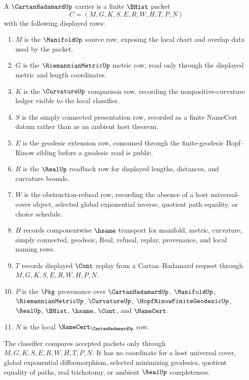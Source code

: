 \begin{definition}
\label{def:cartan-hadamard-carrier}
A $\CartanHadamardUp$ carrier is a finite $\BHist$ packet
$$
C=(M,G,K,S,E,R,W,H,T,P,N)
$$
with the following displayed rows:
\begin{enumerate}
\item $M$ is the $\ManifoldUp$ source row, exposing the local chart and overlap data used by the packet.
\item $G$ is the $\RiemannianMetricUp$ metric row, read only through the displayed metric and length coordinates.
\item $K$ is the $\CurvatureUp$ comparison row, recording the nonpositive-curvature ledger visible to the local classifier.
\item $S$ is the simply connected presentation row, recorded as a finite NameCert datum rather than as an ambient host theorem.
\item $E$ is the geodesic extension row, consumed through the finite-geodesic Hopf--Rinow sibling before a geodesic read is public.
\item $R$ is the $\RealUp$ readback row for displayed lengths, distances, and curvature bounds.
\item $W$ is the obstruction-refusal row, recording the absence of a host universal-cover object, selected global exponential inverse, quotient path equality, or choice schedule.
\item $H$ records componentwise $\hsame$ transport for manifold, metric, curvature, simply connected, geodesic, Real, refusal, replay, provenance, and local naming rows.
\item $T$ records displayed $\Cont$ replay from a Cartan--Hadamard request through $M,G,K,S,E,R,W,H,P,N$.
\item $P$ is the $\Pkg$ provenance over $\CartanHadamardUp$, $\ManifoldUp$, $\RiemannianMetricUp$, $\CurvatureUp$, $\HopfRinowFiniteGeodesicUp$, $\RealUp$, $\BHist$, $\hsame$, $\Cont$, and $\NameCert$.
\item $N$ is the local $\NameCert_{\CartanHadamardUp}$ row.
\end{enumerate}
The classifier compares accepted packets only through $M,G,K,S,E,R,W,H,T,P,N$. It has no coordinate for a host universal cover, global exponential diffeomorphism, selected minimizing geodesics, quotient equality of paths, real trichotomy, or ambient $\RealUp$ completeness.
\end{definition}

